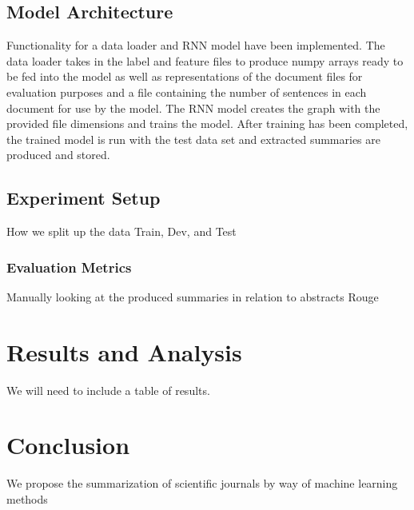 \documentclass[11pt]{article}
\begin{document}
	\subsection{Model Architecture} %
		Functionality for a data loader and RNN model have been implemented. The data loader takes in the label and feature files to produce numpy arrays ready to be fed into the model as well as representations of the document files for evaluation purposes and a file containing the number of sentences in each document for use by the model. The RNN model creates the graph with the provided file dimensions and trains the model. After training has been completed, the trained model is run with the test data set and extracted summaries are produced and stored.
	\subsection{Experiment Setup} 
		How we split up the data
		Train, Dev, and Test
		\subsubsection{Evaluation Metrics}
			Manually looking at the produced summaries in relation to abstracts
			Rouge \cite{ganesan2015}
\section{Results and Analysis} %
	We will need to include a table of results.
\section{Conclusion}
	We propose the summarization of scientific journals by way of machine learning methods \cite{ganesan2015}



\end{document}
